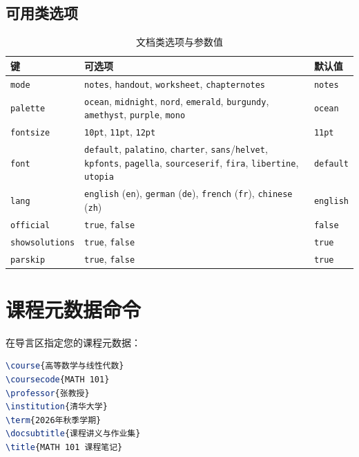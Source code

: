 \documentclass[mode=notes, palette=ocean, lang=chinese, fontsize=11pt]{modernclassnotes}
\begin{document}
\subsection{可用类选项}
\begin{table}[h]
\centering
\begin{tabular}{l|p{9.5cm}|l}
\toprule
\textbf{键} & \textbf{可选项} & \textbf{默认值} \\
\midrule
\texttt{mode} & \texttt{notes}, \texttt{handout}, \texttt{worksheet}, \texttt{chapternotes} & \texttt{notes} \\ \hline
\texttt{palette} & \texttt{ocean}, \texttt{midnight}, \texttt{nord}, \texttt{emerald}, \texttt{burgundy}, \texttt{amethyst}, \texttt{purple}, \texttt{mono} & \texttt{ocean} \\ \hline
\texttt{fontsize} & \texttt{10pt}, \texttt{11pt}, \texttt{12pt} & \texttt{11pt} \\ \hline
\texttt{font} & \texttt{default}, \texttt{palatino}, \texttt{charter}, \texttt{sans}/\texttt{helvet}, \texttt{kpfonts}, \texttt{pagella}, \texttt{sourceserif}, \texttt{fira}, \texttt{libertine}, \texttt{utopia} & \texttt{default} \\ \hline
\texttt{lang} & \texttt{english} (\texttt{en}), \texttt{german} (\texttt{de}), \texttt{french} (\texttt{fr}), \texttt{chinese} (\texttt{zh}) & \texttt{english} \\ \hline
\texttt{official} & \texttt{true}, \texttt{false} & \texttt{false} \\ \hline
\texttt{showsolutions} & \texttt{true}, \texttt{false} & \texttt{true} \\ \hline
\texttt{parskip} & \texttt{true}, \texttt{false} & \texttt{true} \\
\bottomrule
\end{tabular}
\caption{文档类选项与参数值}
\end{table}

\section{课程元数据命令}

在导言区指定您的课程元数据：
\begin{codebox}[元数据配置]
\begin{lstlisting}[language=TeX]
\course{高等数学与线性代数}
\coursecode{MATH 101}
\professor{张教授}
\institution{清华大学}
\term{2026年秋季学期}
\docsubtitle{课程讲义与作业集}
\title{MATH 101 课程笔记}
\end{lstlisting}
\end{codebox}
\end{document}
